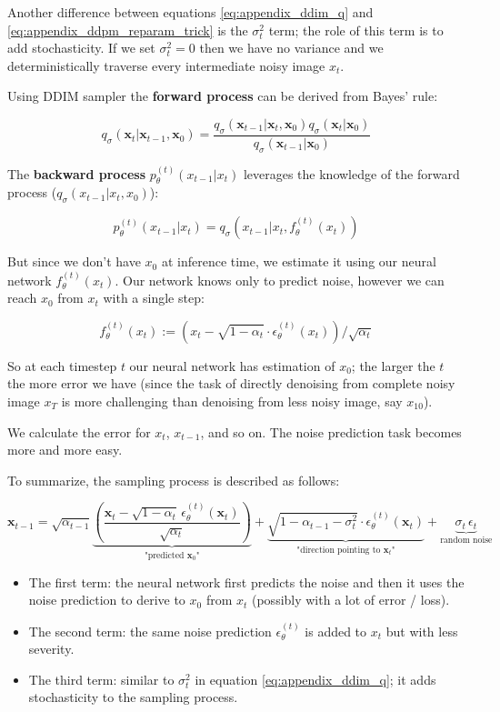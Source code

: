 Another difference between equations \ref{eq:appendix_ddim_q} and \ref{eq:appendix_ddpm_reparam_trick} is the $\sigma_t^2$ term; the role of this term is to add stochasticity. If we set $\sigma_t^2 = 0$ then we have no variance and we deterministically traverse every intermediate noisy image $x_t$.

Using DDIM sampler the \textbf{forward process} can be derived from Bayes' rule:

\[ q_{\sigma}(\mathbf{x}_t | \mathbf{x}_{t-1}, \mathbf{x}_0) = \frac{q_{\sigma}(\mathbf{x}_{t-1} | \mathbf{x}_t, \mathbf{x}_0) q_{\sigma}(\mathbf{x}_t | \mathbf{x}_0)}{q_{\sigma}(\mathbf{x}_{t-1} | \mathbf{x}_0)} \]

The \textbf{backward process} $p_\theta^{(t)} (x_{t-1} | x_t)$ leverages the knowledge of the forward process ($q_\sigma (x_{t-1} | x_t, x_0)$):

\[ p_\theta^{(t)} (x_{t-1} | x_t) = q_\sigma (x_{t-1} | x_t, f_\theta^{(t)} (x_t)) \]

But since we don't have $x_0$ at inference time, we estimate it using our neural network $f_\theta^{(t)} (x_t)$. Our network knows only to predict noise, however we can reach $x_0$ from $x_t$ with a single step:

\[ f_\theta^{(t)} (x_t) := \left( x_t - \sqrt{1 - \alpha_t} \cdot \epsilon_\theta^{(t)} (x_t) \right) / \sqrt{\alpha_t} \]

So at each timestep $t$ our neural network has estimation of $x_0$; the larger the $t$ the more error we have (since the task of directly denoising from complete noisy image $x_T$ is more challenging than denoising from less noisy image, say $x_10$).

We calculate the error for $x_t$, $x_{t-1}$, and so on. The noise prediction task becomes more and more easy.

To summarize, the sampling process is described as follows:

\begin{equation}
\mathbf{x}_{t-1} = \sqrt{\alpha_{t-1}} \underbrace{\left( \frac{\mathbf{x}_t - \sqrt{1 - \alpha_t} \, \epsilon_{\theta}^{(t)}(\mathbf{x}_t)}{\sqrt{\alpha_t}} \right)}_{\text{"predicted } \mathbf{x}_0\text{"}} + \underbrace{\sqrt{1 - \alpha_{t-1} - \sigma_t^2} \cdot \epsilon_{\theta}^{(t)}(\mathbf{x}_t)}_{\text{"direction pointing to } \mathbf{x}_t\text{"}} + \underbrace{\sigma_t \, \epsilon_t}_{\text{random noise}}
\end{equation}

\begin{itemize}
    \item The first term: the neural network first predicts the noise and then it uses the noise prediction to derive to $x_0$ from $x_t$ (possibly with a lot of error / loss).
    \item The second term: the same noise prediction $\epsilon_{\theta}^{(t)}$ is added to $x_t$ but with less severity.
    \item The third term: similar to $\sigma_t^2$ in equation \ref{eq:appendix_ddim_q}; it adds stochasticity to the sampling process.
\end{itemize}

